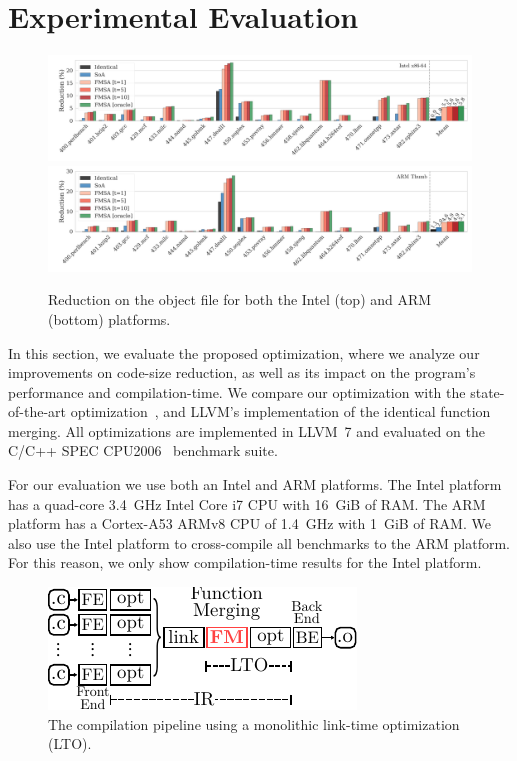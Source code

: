 \section{Experimental Evaluation}
\begin{figure}[b]
  \centering
  \includegraphics[width=\linewidth]{figs/reduction-obj-intel-label.pdf}
  \includegraphics[width=\linewidth]{figs/reduction-obj-arm-label.pdf}
  \caption{Reduction on the object file for both the Intel (top) and ARM (bottom) platforms.}
  \label{fig:reduction-obj}
\end{figure}

In this section, we evaluate the proposed optimization, where we analyze our
improvements on code-size reduction, as well as its impact on the program's
performance and compilation-time.
We compare our optimization with the state-of-the-art optimization~\cite{edler14},
and LLVM's implementation of the identical function merging.
All optimizations are implemented in LLVM~7 and evaluated on the C/C++ SPEC
CPU2006~\cite{spec} benchmark suite.

For our evaluation we use both an Intel and ARM platforms.
The Intel platform has a quad-core 3.4~GHz Intel Core i7 CPU with 16~GiB of RAM.
The ARM platform has a Cortex-A53 ARMv8 CPU of 1.4~GHz with 1~GiB of RAM.
We also use the Intel platform to cross-compile all benchmarks to the ARM
platform.
For this reason, we only show compilation-time results for the Intel platform.

\begin{figure}[h]
  \centering
  \includegraphics[width=0.8\linewidth]{figs/opt-pipeline.pdf}
  \caption{The compilation pipeline using a monolithic link-time optimization (LTO).}
  \label{fig:opt-pipeline}
\end{figure}

